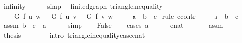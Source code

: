 \begin{isabellebody}
\ infinity\isanewline
\ \ \ \ \isamarkupfalse%
\ simp\isanewline
{}\isamarkupfalse%
%
\endisatagproof
{\isafoldproof}%
%
\isadelimproof
\isanewline
%
\endisadelimproof
%
\isadeliminvisible
\isanewline
%
\endisadeliminvisible
%
\isataginvisible
{}\isamarkupfalse%
\ {\isacharparenleft}{\kern0pt}\ finite{\isacharunderscore}{\kern0pt}dgraph{\isacharparenright}{\kern0pt}\ {\isasymdelta}{\isacharunderscore}{\kern0pt}triangle{\isacharunderscore}{\kern0pt}inequality{\isacharcolon}{\kern0pt}\isanewline
\ \ \ {\isachardoublequoteopen}{\isasymdelta}\ G\ f\ u\ w\ {\isasymle}\ {\isasymdelta}\ G\ f\ u\ v\ {\isacharplus}{\kern0pt}\ {\isasymdelta}\ G\ f\ v\ w{\isachardoublequoteclose}\isanewline
\ \ \ \ {\isacharparenleft}{\kern0pt}\ {\isachardoublequoteopen}{\isacharquery}{\kern0pt}a\ {\isasymle}\ {\isacharquery}{\kern0pt}b\ {\isacharplus}{\kern0pt}\ {\isacharquery}{\kern0pt}c{\isachardoublequoteclose}{\isacharparenright}{\kern0pt}%
\endisataginvisible
{\isafoldinvisible}%
%
\isadeliminvisible
\isanewline
%
\endisadeliminvisible
%
\isadelimproof
%
\endisadelimproof
%
\isatagproof
{}\isamarkupfalse%
\ {\isacharparenleft}{\kern0pt}rule\ ccontr{\isacharparenright}{\kern0pt}\isanewline
\ \ \isamarkupfalse%
\ {\isachardoublequoteopen}{\isasymnot}\ {\isacharquery}{\kern0pt}a\ {\isasymle}\ {\isacharquery}{\kern0pt}b\ {\isacharplus}{\kern0pt}\ {\isacharquery}{\kern0pt}c{\isachardoublequoteclose}\isanewline
\ \ \isamarkupfalse%
\ assm{\isacharcolon}{\kern0pt}\ {\isachardoublequoteopen}{\isacharquery}{\kern0pt}b\ {\isacharplus}{\kern0pt}\ {\isacharquery}{\kern0pt}c\ {\isacharless}{\kern0pt}\ {\isacharquery}{\kern0pt}a{\isachardoublequoteclose}\isanewline
\ \ \ \ \isamarkupfalse%
\ simp\isanewline
\ \ \isamarkupfalse%
\ {\isachardoublequoteopen}False{\isachardoublequoteclose}\isanewline
\ \ \isamarkupfalse%
\ {\isacharparenleft}{\kern0pt}cases\ {\isacharquery}{\kern0pt}a{\isacharparenright}{\kern0pt}\isanewline
\ \ \ \ \isamarkupfalse%
\ {\isacharparenleft}{\kern0pt}enat\ {\isacharunderscore}{\kern0pt}{\isacharparenright}{\kern0pt}\isanewline
\ \ \ \ \isamarkupfalse%
\ assm\isanewline
\ \ \ \ \isamarkupfalse%
\ {\isacharquery}{\kern0pt}thesis\isanewline
\ \ \ \ \ \ \isamarkupfalse%
\ {\isacharparenleft}{\kern0pt}intro\ {\isasymdelta}{\isacharunderscore}{\kern0pt}triangle{\isacharunderscore}{\kern0pt}inequality{\isacharunderscore}{\kern0pt}case{\isacharunderscore}{\kern0pt}enat{\isacharparenright}{\kern0pt}\isanewline

\end{isabellebody}
